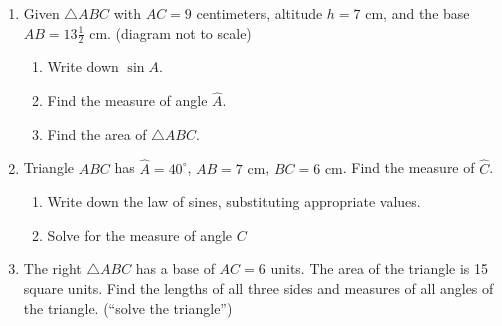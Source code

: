 \documentclass[12pt, twoside]{article}
\begin{document}
\begin{enumerate}
\item Given $\triangle ABC$ with $AC=9$ centimeters, altitude $h=7$ cm, and the base $AB=13 \frac{1}{2}$ cm. (diagram not to scale)
\begin{multicols}{2}
  \begin{enumerate}
    \item Write down $\sin A$.
    \item Find the measure of angle $\hat{A}$.
    \item Find the area of $\triangle ABC$. 
  \end{enumerate}
\end{multicols}
\vspace{1cm}

\newpage
\item Triangle $ABC$ has $\hat{A}=40^\circ$, $AB=7 \text{ cm}$, $BC=6 \text{ cm}$. Find the measure of $\hat{C}$.
  \begin{enumerate}[itemsep=3cm]
        \item Write down the law of sines, substituting appropriate values.
        \item Solve for the measure of angle $C$
  \end{enumerate}
  \begin{flushright}
  \end{flushright}\vspace{2cm}

\item The right $\triangle ABC$ has a base of $AC=6$ units. The area of the triangle is 15 square units. Find the lengths of all three sides and measures of all angles of the triangle. (``solve the triangle'')
  \begin{flushright}
  \end{flushright}
 


\end{enumerate}
\end{document}

